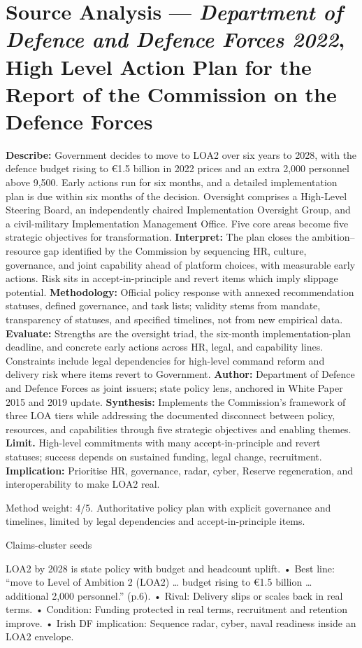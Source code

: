 \section*{Source Analysis — \textit{Department of Defence and Defence Forces 2022}, High Level Action Plan for the Report of the Commission on the Defence Forces}
\textbf{Describe:} Government decides to move to LOA2 over six years to 2028, with the defence budget rising to €1.5 billion in 2022 prices and an extra 2,000 personnel above 9,500. Early actions run for six months, and a detailed implementation plan is due within six months of the decision. Oversight comprises a High-Level Steering Board, an independently chaired Implementation Oversight Group, and a civil-military Implementation Management Office. Five core areas become five strategic objectives for transformation.
\textbf{Interpret:} The plan closes the ambition–resource gap identified by the Commission by sequencing HR, culture, governance, and joint capability ahead of platform choices, with measurable early actions. Risk sits in accept-in-principle and revert items which imply slippage potential.
\textbf{Methodology:} Official policy response with annexed recommendation statuses, defined governance, and task lists; validity stems from mandate, transparency of statuses, and specified timelines, not from new empirical data.
\textbf{Evaluate:} Strengths are the oversight triad, the six-month implementation-plan deadline, and concrete early actions across HR, legal, and capability lines. Constraints include legal dependencies for high-level command reform and delivery risk where items revert to Government.
\textbf{Author:} Department of Defence and Defence Forces as joint issuers; state policy lens, anchored in White Paper 2015 and 2019 update.
\textbf{Synthesis:} Implements the Commission’s framework of three LOA tiers while addressing the documented disconnect between policy, resources, and capabilities through five strategic objectives and enabling themes.
\textbf{Limit.} High-level commitments with many accept-in-principle and revert statuses; success depends on sustained funding, legal change, recruitment. \textbf{Implication:} Prioritise HR, governance, radar, cyber, Reserve regeneration, and interoperability to make LOA2 real.

Method weight: 4/5. Authoritative policy plan with explicit governance and timelines, limited by legal dependencies and accept-in-principle items.

Claims-cluster seeds

LOA2 by 2028 is state policy with budget and headcount uplift.
• Best line: “move to Level of Ambition 2 (LOA2) … budget rising to €1.5 billion … additional 2,000 personnel.” (p.6).
• Rival: Delivery slips or scales back in real terms.
• Condition: Funding protected in real terms, recruitment and retention improve.
• Irish DF implication: Sequence radar, cyber, naval readiness inside an LOA2 envelope.

